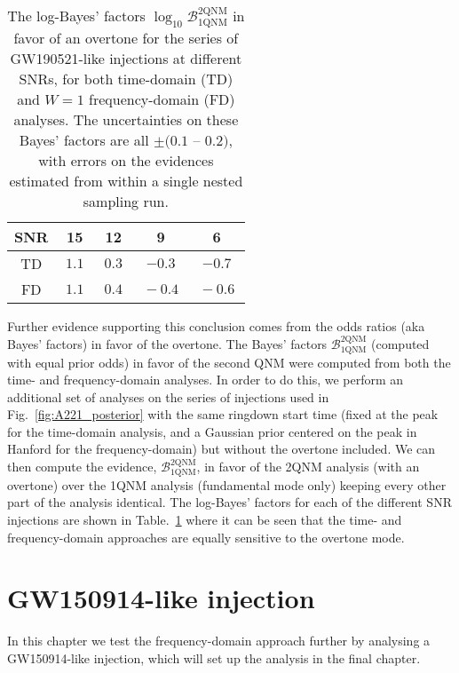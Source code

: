 \begin{table}
	\centering
	\begin{tabular}{c|cccc}
		SNR & 15   & 12   & 9   & 6   \\ \hline
		TD & $~ 1.1 ~$ & $0.3$ & $-0.3$ & $-0.7$ \\
		FD & $~ 1.1 ~$ & $~ 0.4 ~$ & $~ -0.4 ~ $ & $~ -0.6 ~$   
	\end{tabular}
	\caption[The log-Bayes' factors in favor of an overtone for the series of GW190521-like injections at different SNRs, for both time-domain and $W=1$ frequency-domain analyses]{ 
		The log-Bayes' factors $\log_{10}\mathcal{B}^{2\mathrm{QNM}}_{1\mathrm{QNM}}$ in favor of an overtone for the series of GW190521-like injections at different SNRs, for both time-domain (TD) and $W=1$ frequency-domain (FD) analyses. 
		The uncertainties on these Bayes' factors are all $\pm (0.1$ -- $0.2)$, with errors on the evidences estimated from within a single nested sampling run.
	}
	\label{tab:bayes_factors}
\end{table}

Further evidence supporting this conclusion comes from the odds ratios (aka Bayes' factors) in favor of the overtone.
The Bayes' factors $\mathcal{B}^{2\mathrm{QNM}}_{1\mathrm{QNM}}$ (computed with equal prior odds) in favor of the second QNM were computed from both the time- and frequency-domain analyses. 
In order to do this, we perform an additional set of analyses on the series of injections used in Fig.~\ref{fig:A221_posterior} with the same ringdown start time (fixed at the peak for the time-domain analysis, and a Gaussian prior centered on the peak in Hanford for the frequency-domain) but without the overtone included.
We can then compute the evidence, $\mathcal{B}_{1\mathrm{QNM}}^{2\mathrm{QNM}}$, in favor of the 2QNM analysis (with an overtone) over the 1QNM analysis (fundamental mode only) keeping every other part of the analysis identical. 
The log-Bayes' factors for each of the different SNR injections are shown in Table.~\ref{tab:bayes_factors} where it can be seen that the time- and frequency-domain approaches are equally sensitive to the overtone mode.


\section{GW150914-like injection}\label{app:GW150914}

In this chapter we test the frequency-domain approach further by analysing a GW150914-like injection, which will set up the analysis in the final chapter.

